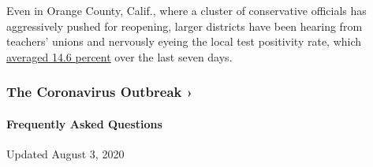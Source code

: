 Even in Orange County, Calif., where a cluster of conservative officials
has aggressively pushed for reopening, larger districts have been
hearing from teachers' unions and nervously eyeing the local test
positivity rate, which
\href{https://ochca.maps.arcgis.com/apps/opsdashboard/index.html\#/cc4859c8c522496b9f21c451de2fedae}{averaged
14.6 percent} over the last seven days.

\href{https://www.nytimes3xbfgragh.onion/news-event/coronavirus?action=click\&pgtype=Article\&state=default\&region=MAIN_CONTENT_3\&context=storylines_faq}{}

\hypertarget{the-coronavirus-outbreak-}{%
\subsubsection{The Coronavirus Outbreak
›}\label{the-coronavirus-outbreak-}}

\hypertarget{frequently-asked-questions}{%
\paragraph{Frequently Asked
Questions}\label{frequently-asked-questions}}

Updated August 3, 2020

